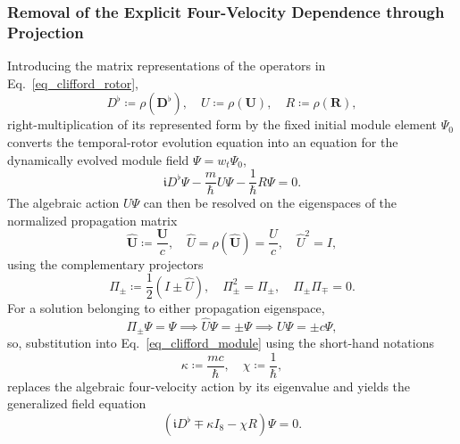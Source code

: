 \subsubsection{Removal of the Explicit Four-Velocity Dependence through Projection}
Introducing the matrix representations of the operators in Eq.~\eqref{eq_clifford_rotor},
\begin{equation}
    D^{\flat} \coloneqq \rho(\mathbf{D}^{\flat}),\quad U \coloneqq \rho(\mathbf{U}),\quad R \coloneqq \rho(\mathbf{R}),
\end{equation}
right-multiplication of its represented form by the fixed initial module element $\Psi_{0}$ converts the temporal-rotor evolution equation into an equation for the dynamically evolved module field $\Psi = w_{t}\Psi_{0}$,
\begin{equation}\label{eq_clifford_module}
    \mathfrak{i}D^{\flat}\Psi - \frac{m}{\hbar}U\Psi - \frac{1}{\hbar}R\Psi = 0.
\end{equation}
The algebraic action $U\Psi$ can then be resolved on the eigenspaces of the normalized propagation matrix
\begin{equation}
    \hat{\mathbf{U}}\coloneqq\frac{\mathbf{U}}{c}, \quad \hat{U} =\rho(\hat{\mathbf{U}})= \frac{U}{c},\quad \hat{U}^{2} = I,
\end{equation}
using the complementary projectors
\begin{equation}
    \Pi_{\pm} \coloneqq \frac{1}{2}\left(I \pm \hat{U}\right),\quad \Pi_{\pm}^{2} = \Pi_{\pm},\quad \Pi_{\pm}\Pi_{\mp} = 0.
\end{equation}
For a solution belonging to either propagation eigenspace,
\begin{equation}
    \Pi_{\pm}\Psi = \Psi \implies \hat{U}\Psi = \pm\Psi \implies U\Psi = \pm c\Psi,
\end{equation}
so, substitution into Eq.~\eqref{eq_clifford_module} using the short-hand notations
\begin{equation}
    \kappa \coloneqq \frac{mc}{\hbar}, \quad \chi \coloneqq \frac{1}{\hbar},
\end{equation}
replaces the algebraic four-velocity action by its eigenvalue and yields the generalized field equation
\begin{equation}\label{eq_clifford_field}
    \left(\mathfrak{i}D^{\flat} \mp \kappa I_{8} - \chi R\right)\Psi = 0.
\end{equation}

